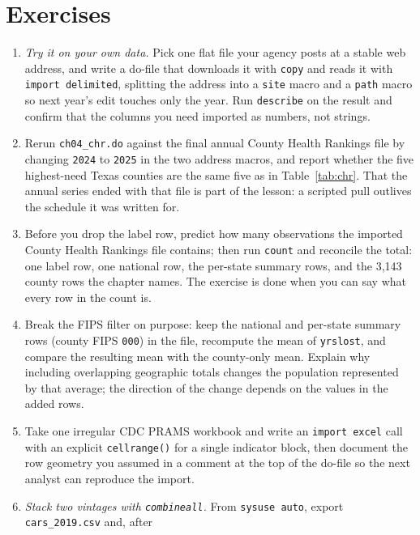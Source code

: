 \section*{Exercises}
\begin{enumerate}
  \item \emph{Try it on your own data.} Pick one flat file your
    agency posts at a stable web address, and write a do-file that
    downloads it with \texttt{copy} and reads it with
    \texttt{import delimited}, splitting the address into a
    \texttt{site} macro and a \texttt{path} macro so next year's
    edit touches only the year. Run \texttt{describe} on the result
    and confirm that the columns you need imported as numbers, not
    strings.
  \item Rerun \texttt{ch04\_chr.do} against the final annual County
    Health Rankings file by changing \texttt{2024} to \texttt{2025}
    in the two address macros, and report whether the five
    highest-need Texas counties are the same five as in
    Table~\ref{tab:chr}. That the annual series ended with that
    file is part of the lesson: a scripted pull outlives the
    schedule it was written for.
  \item Before you drop the label row, predict how many observations
    the imported County Health Rankings file contains; then run
    \texttt{count} and reconcile the total: one label row, one
    national row, the per-state summary rows, and the 3{,}143 county
    rows the chapter names. The exercise is done when you can
    say what every row in the count is.
  \item Break the FIPS filter on purpose: keep the national and
    per-state summary rows (county FIPS \texttt{000}) in the file,
    recompute the mean of \texttt{yrslost}, and compare the resulting mean with the county-only mean. Explain why
    including overlapping geographic totals changes the population
    represented by that average; the direction of the change depends
    on the values in the added rows.
  \item Take one irregular CDC PRAMS workbook and write an
    \texttt{import excel} call with an explicit \texttt{cellrange()}
    for a single indicator block, then document the row geometry you
    assumed in a comment at the top of the do-file so the next
    analyst can reproduce the import.
  \item \emph{Stack two vintages with \texttt{combineall}.} From
    \texttt{sysuse auto}, export \texttt{cars\_2019.csv} and, after

\end{enumerate}
